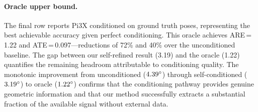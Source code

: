 \paragraph{Oracle upper bound.} The final row reports Pi3X conditioned on ground truth poses, representing the best achievable accuracy given perfect conditioning. This oracle achieves ARE\,=\,1.22\degree{} and ATE\,=\,0.097---reductions of 72\% and 40\% over the unconditioned baseline. The gap between our self-refined result (3.19\degree{}) and the oracle (1.22\degree{}) quantifies the remaining headroom attributable to conditioning quality. The monotonic improvement from unconditioned ($4.39\degree$) through self-conditioned ($3.19\degree$) to oracle ($1.22\degree$) confirms that the conditioning pathway provides genuine geometric information and that our method successfully extracts a substantial fraction of the available signal without external data.
